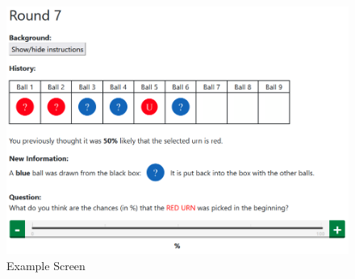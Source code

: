 \documentclass{article}
\begin{document}
\begin{figure}[!htb]
    \centering
    \includegraphics[width=15cm]{Fig/screen.png}
    \caption{Example Screen}
    \label{fig:example_screen}
\end{figure}
\end{document}
